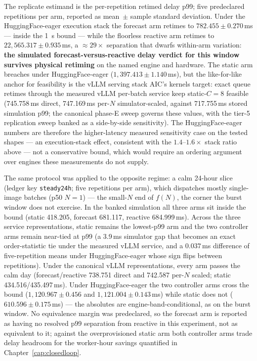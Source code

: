 The replicate estimand is the per-repetition retimed delay p99; five
predeclared repetitions per arm, reported as mean~$\pm$ sample standard
deviation. Under the HuggingFace-eager execution stack the forecast arm
retimes to $782.455 \pm 0.270$\,ms --- inside the \SI{1}{\second} bound
--- while the floorless reactive arm retimes to $22{,}565.317 \pm
0.935$\,ms, a ${\approx}29\times$ separation that dwarfs within-arm
variation: \textbf{the simulated forecast-versus-reactive delay verdict for
this window survives physical retiming} on the named engine and hardware.
The static arm breaches under HuggingFace-eager ($1{,}397.413 \pm
1.140$\,ms), but the like-for-like anchor for feasibility is the vLLM
serving stack AIC's kernels target: exact queue retimes through the
measured vLLM per-batch service keep static-$C{=}8$ feasible
(\num{745.758}\,ms direct, \num{747.169}\,ms per-$N$ simulator-scaled,
against \num{717.755}\,ms stored simulation p99; the canonical phase-E
sweep governs these values, with the tier-5 replication sweep banked as a
side-by-side sensitivity). The HuggingFace-eager
numbers are therefore the higher-latency measured sensitivity case on the
tested shapes --- an execution-stack effect, consistent with the
$1.4$--$1.6\times$ stack ratio above --- not a conservative bound, which
would require an ordering argument over engines these measurements do not
supply.

The same protocol was applied to the opposite regime: a calm 24-hour slice
(ledger key \texttt{steady24h}; five repetitions per arm), which
dispatches mostly single-image batches (p50 $N{=}1$) --- the small-$N$ end
of $f(N)$, the corner the burst window does not exercise. In the banked
simulation all three arms sit inside the bound (static \num{418.205},
forecast \num{681.117}, reactive \num{684.999}\,ms). Across the three
service representations, static remains the lowest-p99 arm and the two
controller arms remain near-tied at p99 (a 3.9\,ms simulator gap that
becomes an exact order-statistic tie under the measured vLLM service,
and a $0.037$\,ms difference of five-repetition means under
HuggingFace-eager whose sign flips between repetitions). Under the
canonical vLLM representations, every arm passes the calm day
(forecast/reactive \num{738.751} direct and \num{742.587} per-$N$
scaled; static \num{434.516}/\num{435.497}\,ms). Under
HuggingFace-eager the two controller arms cross the bound
($1{,}120.967 \pm 0.456$ and $1{,}121.004 \pm 0.143$\,ms) while
static does not ($610.596 \pm 0.175$\,ms) --- the absolutes are
engine-band-conditional, as on the burst window. No equivalence margin
was predeclared, so the forecast arm is reported as having no resolved
p99 separation from reactive in this experiment, not as equivalent to
it; against the overprovisioned static arm both controller arms trade
delay headroom for the worker-hour savings quantified in
Chapter~\ref{cap:closedloop}.

